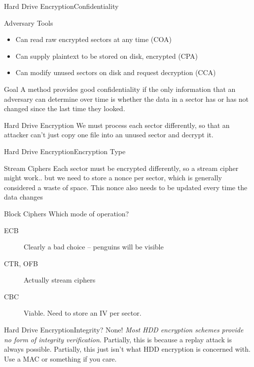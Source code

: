 \documentclass[12pt]{beamer}
\begin{document}
\begin{frame}{Hard Drive Encryption}{Confidentiality}
\begin{block}{Adversary Tools}
\begin{itemize}
	\item Can read raw encrypted sectors at any time (COA)
	\item Can supply plaintext to be stored on disk, encrypted (CPA)
	\item Can modify unused sectors on disk and request decryption (CCA)
\end{itemize}
\end{block}

\begin{block}{Goal}
A method provides good confidentiality if the only information that an adversary
can determine over time is whether the data in a sector has or has not changed
since the last time they looked.
\end{block}
\end{frame}

\begin{frame}{Hard Drive Encryption}
	\centering
	We must process each sector differently, so that an attacker can't just copy one
	file into an unused sector and decrypt it.
\end{frame}

\begin{frame}{Hard Drive Encryption}{Encryption Type}
\begin{block}{Stream Ciphers}
	Each sector must be encrypted differently, so a stream cipher might work..
	but we need to store a nonce per sector, which is generally considered a
	waste of space. This nonce also needs to be updated every time the data
	changes
\end{block}
\begin{block}{Block Ciphers}
	Which mode of operation? \begin{description}
		\item[ECB] Clearly a bad choice -- penguins will be visible
		\item[CTR, OFB] Actually stream ciphers
		\item[CBC] Viable. Need to store an IV per sector.
	\end{description}
\end{block}
\end{frame}

\begin{frame}{Hard Drive Encryption}{Integrity?}
	\centering
	None! \textit{Most HDD encryption schemes provide no form of integrity
	verification}. Partially, this is because a replay attack is always
	possible. Partially, this just isn't what HDD encryption is concerned with.
	Use a MAC or something if you care.
\end{frame}
\end{document}
